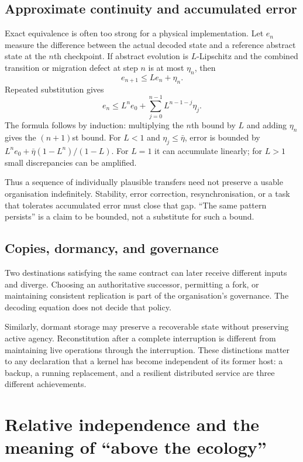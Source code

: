 \documentclass[11pt,a4paper]{article}
\theoremstyle{definition}
\theoremstyle{remark}
\begin{document}
\subsection{Approximate continuity and accumulated error}
Exact equivalence is often too strong for a physical implementation. Let $e_n$ measure the difference between the actual decoded state and a reference abstract state at the $n$th checkpoint. If abstract evolution is $L$-Lipschitz and the combined transition or migration defect at step $n$ is at most $\eta_n$, then
\begin{equation}\label{eq:errorrec}
 e_{n+1}\leq Le_n+\eta_n.
\end{equation}
Repeated substitution gives
\begin{equation}\label{eq:errorbound}
 e_n\leq L^ne_0+\sum_{j=0}^{n-1}L^{n-1-j}\eta_j.
\end{equation}
The formula follows by induction: multiplying the $n$th bound by $L$ and adding $\eta_n$ gives the $(n+1)$st bound. For $L<1$ and $\eta_j\leq\bar\eta$, error is bounded by $L^ne_0+\bar\eta(1-L^n)/(1-L)$. For $L=1$ it can accumulate linearly; for $L>1$ small discrepancies can be amplified.

Thus a sequence of individually plausible transfers need not preserve a usable organisation indefinitely. Stability, error correction, resynchronisation, or a task that tolerates accumulated error must close that gap. ``The same pattern persists'' is a claim to be bounded, not a substitute for such a bound.

\subsection{Copies, dormancy, and governance}
Two destinations satisfying the same contract can later receive different inputs and diverge. Choosing an authoritative successor, permitting a fork, or maintaining consistent replication is part of the organisation's governance. The decoding equation does not decide that policy.

Similarly, dormant storage may preserve a recoverable state without preserving active agency. Reconstitution after a complete interruption is different from maintaining live operations through the interruption. These distinctions matter to any declaration that a kernel has become independent of its former host: a backup, a running replacement, and a resilient distributed service are three different achievements.

\section{Relative independence and the meaning of ``above the ecology''}\label{sec:independence}
\end{document}
